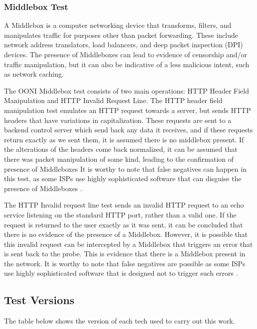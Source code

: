 \subsubsection{Middlebox Test}

A Middlebox is a computer networking device that transforms, filters, and manipulates traffic for purposes other than packet forwarding. These include network address translators, load balancers, and deep packet inspection (DPI) devices. The presence of Middleboxes can lead to evidence of censorship and/or traffic manipulation, but it can also be indicative of a less malicious intent, such as network caching.

The OONI Middlebox test consists of two main operations: HTTP Header Field Manipulation and HTTP Invalid Request Line. The HTTP header field manipulation test emulates an HTTP request towards a server, but sends HTTP headers that have variations in capitalization. These requests are sent to a backend control server which send back any data it receives, and if these requests return exactly as we sent them, it is assumed there is no middlebox present. If the alterations of the headers come back normalized, it can be assumed that there was packet manipulation of some kind, leading to the confirmation of presence of Middleboxes It is worthy to note that false negatives can happen in this test, as some ISPs use highly sophisticated software that can disguise the presence of Middleboxes \cite{ooniHTTPHeader}.  

The HTTP Invalid request line test sends an invalid HTTP request to an echo service listening on the standard HTTP port, rather than a valid one. If the request is returned to the user exactly as it was sent, it can be concluded that there is no evidence of the presence of a Middlebox. However, it is possible that this invalid request can be intercepted by a Middlebox that triggers an error that is sent back to the probe. This is evidence that there is a Middlebox present in the network. It is worthy to note that false negatives are possible as some ISPs use highly sophisticated software that is designed not to trigger such errors \cite{ooniHTTPInvalid}.

\subsection{Test Versions}

The table below shows the version of each tech used to carry out this work.

\vspace{1.5em}

